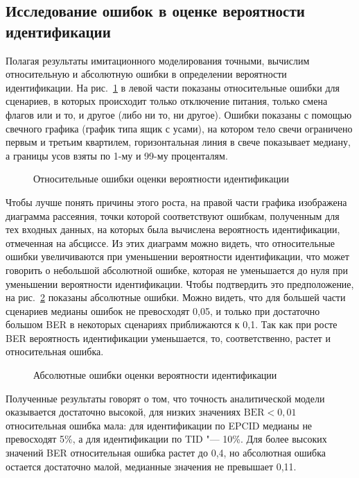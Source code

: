\subsection{Исследование ошибок в оценке вероятности идентификации}

Полагая результаты имитационного моделирования точными, вычислим относительную и абсолютную ошибки в определении вероятности идентификации. На рис.~\ref{fig:ch3_results_rel_errors} в левой части показаны относительные ошибки для сценариев, в которых происходит только отключение питания, только смена флагов или и то, и другое (либо ни то, ни другое). Ошибки показаны с помощью свечного графика (график типа ящик с усами), на котором тело свечи ограничено первым и третьим квартилем, горизонтальная линия в свече показывает медиану, а границы усов взяты по 1-му и 99-му проценталям.

\begin{figure}[htb]
  \caption{Относительные ошибки оценки вероятности идентификации}
  \label{fig:ch3_results_rel_errors}
\end{figure}

Чтобы лучше понять причины этого роста, на правой части графика изображена диаграмма рассеяния, точки которой соответствуют ошибкам, полученным для тех входных данных, на которых была вычислена вероятность идентификации, отмеченная на абсциссе. Из этих диаграмм можно видеть, что относительные ошибки увеличиваются при уменьшении вероятности идентификации, что может говорить о небольшой абсолютной ошибке, которая не уменьшается до нуля при уменьшении вероятности идентификации. Чтобы подтвердить это предположение, на рис.~\ref{fig:ch3_results_abs_errors} показаны абсолютные ошибки. Можно видеть, что для большей части сценариев медианы ошибок не превосходят 0,05, и только при достаточно большом BER в некоторых сценариях приближаются к 0,1. Так как при росте BER вероятность идентификации уменьшается, то, соответственно, растет и относительная ошибка.


\begin{figure}[htb]
  \caption{Абсолютные ошибки оценки вероятности идентификации}
  \label{fig:ch3_results_abs_errors}
\end{figure}

Полученные результаты говорят о том, что точность аналитической модели оказывается достаточно высокой, для низких значениях $\text{BER} < 0,01$ относительная ошибка мала: для идентификации по EPCID медианы не превосходят 5\%, а для идентификации по TID "--- 10\%. Для более высоких значений BER относительная ошибка растет до 0,4, но абсолютная ошибка остается достаточно малой, медианные значения не превышает 0,11.




